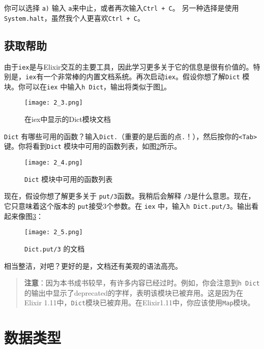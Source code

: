 你可以选择 \texttt{a)} 输入 \texttt{a}来中止，或者再次输入\texttt{Ctrl + C}。
另一种选择是使用\texttt{System.halt}，虽然我个人更喜欢\texttt{Ctrl + C}。

\subsection{获取帮助}

由于\texttt{iex}是与Elixir交互的主要工具，因此学习更多关于它的信息是很有价值的。特别是，\texttt{iex}有一个非常棒的内置文档系统。再次启动\texttt{iex}。假设你想了解\texttt{Dict} 模块。你可以在\texttt{iex} 中输入\texttt{h Dict}，输出将类似于图\ref{fig:2_3}。

\begin{figure}[!ht]
    \centering
    \texttt{[image: 2\_3.png]}
    \caption{在iex中显示的Dict模块文档}
    \label{fig:2_3}
\end{figure}


\texttt{Dict} 有哪些可用的函数？输入\texttt{Dict.}（重要的是后面的点\texttt{.}！），然后按你的\texttt{<Tab>} 键。你将看到\texttt{Dict} 模块中可用的函数列表，如图\ref{fig:2_4}所示。

\begin{figure}[!ht]
    \centering
    \texttt{[image: 2\_4.png]}
    \caption{\texttt{Dict} 模块中可用的函数列表}
    \label{fig:2_4}
\end{figure}


现在，假设你想了解更多关于 \texttt{put/3}函数。我稍后会解释 \texttt{/3}是什么意思。现在，它只意味着这个版本的 \texttt{put}接受3个参数。在 \texttt{iex} 中，输入\texttt{h Dict.put/3}。输出看起来像图\ref{fig:2_5}：

\begin{figure}[!ht]
    \centering
    \texttt{[image: 2\_5.png]}
    \caption{\texttt{Dict.put/3} 的文档}
    \label{fig:2_5}
\end{figure}


相当整洁，对吧？更好的是，文档还有美观的语法高亮。

\begin{quote}
\textbf{注意}：因为本书成书较早，有许多内容已经过时。例如，你会注意到\texttt{h Dict}的输出中显示了deprecated的字样，表明该模块已被弃用。这是因为在Elixir 1.11中，\texttt{Dict}模块已被弃用。在Elixir1.11中，你应该使用\texttt{Map}模块。
\end{quote}

\section{数据类型}

